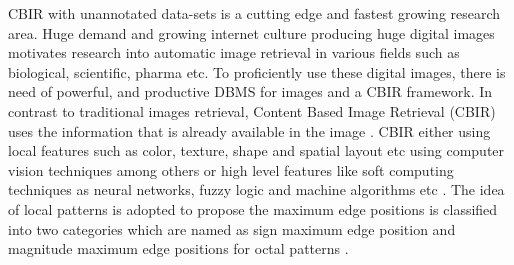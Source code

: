 \documentclass[review]{elsarticle}
\begin{document}
CBIR with unannotated data-sets is a cutting edge and fastest growing  research area.
 Huge demand and growing internet culture producing 
huge digital images  motivates research into automatic image retrieval in various fields such as biological, scientific, pharma etc. To proficiently use these digital images, there is need of powerful, and productive DBMS for images and a CBIR framework. In contrast to traditional images retrieval, Content Based Image Retrieval (CBIR) uses the information that is already available in the image \cite{19whitehill2014faces}. CBIR either using local features such as color, texture, shape and spatial layout etc \cite{20tariq2012recognizing,21yang2002detecting,22vipparthi2016local} using computer vision techniques among others or high level features like soft computing techniques as neural networks, fuzzy logic and machine algorithms etc \cite{23hayat2014automatic,24vipparthi2015local}. The idea of local patterns is adopted to propose the maximum edge positions is classified into two categories which are named as sign maximum edge position and magnitude maximum edge positions for octal patterns \cite{subrahmanyam2012local}. 


\end{document}
